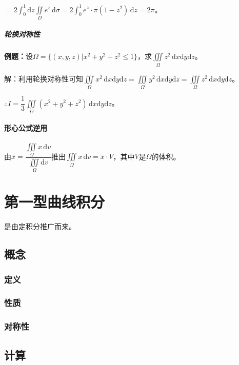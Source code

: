 \documentclass[UTF8, 12pt]{ctexart}
\begin{document}
$=2\int_0^1\textrm{d}z\iint\limits_De^z\,\textrm{d}\sigma=2\int_0^1e^z\cdot\pi(1-z^2)\,\textrm{d}z=2\pi$。

\subparagraph{轮换对称性} \leavevmode \medskip

\textbf{例题：}设$\Omega=\{(x,y,z)|x^2+y^2+z^2\leqslant1\}$，求$\iiint\limits_\Omega z^2\,\textrm{d}x\textrm{d}y\textrm{d}z$。

解：利用轮换对称性可知$\iiint\limits_\Omega x^2\,\textrm{d}x\textrm{d}y\textrm{d}z=\iiint\limits_\Omega y^2\,\textrm{d}x\textrm{d}y\textrm{d}z=\iiint\limits_\Omega z^2\,\textrm{d}x\textrm{d}y\textrm{d}z$。

$\therefore I=\dfrac{1}{3}\iiint\limits_\Omega(x^2+y^2+z^2)\,\textrm{d}x\textrm{d}y\textrm{d}z$。

\paragraph{形心公式逆用} \leavevmode \medskip

由$\overline{x}=\dfrac{\iiint\limits_\Omega x\,\textrm{d}v}{\iiint\limits_\Omega\textrm{d}v}$推出$\iiint\limits_\Omega x\,\textrm{d}v=\overline{x}\cdot V$，其中$V$是$\Omega$的体积。

\section{第一型曲线积分}

是由定积分推广而来。

\subsection{概念}

\subsubsection{定义}

\subsubsection{性质}

\subsubsection{对称性}

\subsection{计算}
\end{document}
